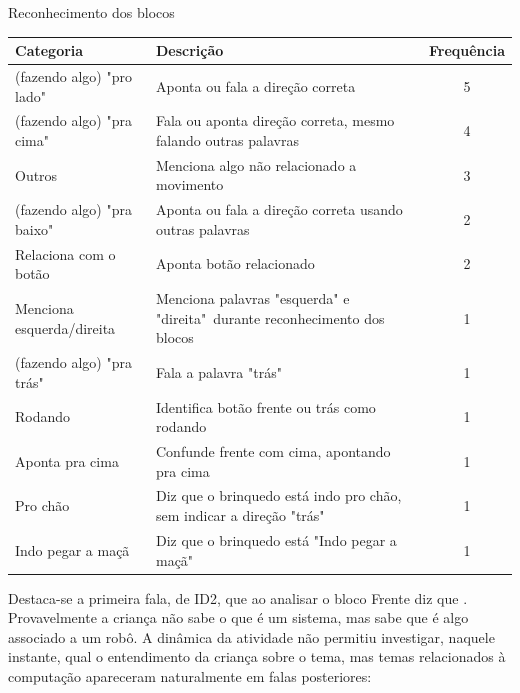 \begin{quadro}[!h]
   \begin{table_env}
   \caption{Reconhecimento dos blocos}
    \label{quadro:reconhecimentoblocos}
    \begin{tabular}{@{}l m{} c@{}}
        \toprule
        Categoria                   & Descrição                                                                  & Frequência \\ \midrule
        (fazendo algo) "pro lado"   & Aponta ou fala a direção correta                                           & 5 \\
        (fazendo algo) "pra cima"   & Fala ou aponta direção correta, mesmo falando outras palavras              & 4 \\
        Outros                      & Menciona algo não relacionado a movimento                                  & 3 \\
        (fazendo algo) "pra baixo"  & Aponta ou fala a direção correta usando outras palavras                    & 2 \\
        Relaciona com o botão       & Aponta botão relacionado                                                   & 2 \\
        Menciona esquerda/direita   & Menciona palavras "esquerda" e "direita"\ durante reconhecimento dos blocos & 1 \\
        (fazendo algo) "pra trás"   & Fala a palavra "trás"                                                      & 1 \\
        Rodando                     & Identifica botão frente ou trás como rodando                               & 1 \\
        Aponta pra cima             & Confunde frente com cima, apontando pra cima                               & 1 \\
        Pro chão                    & Diz que o brinquedo está indo pro chão, sem indicar a direção "trás"       & 1 \\ \nidrule
        Indo pegar a maçã           & Diz que o brinquedo está "Indo pegar a maçã"                               & 1 \\ \bottomrule
        \end{tabular}
   \end{table_env}
   \sourceauthor
\end{quadro}

Destaca-se a primeira fala, de ID2, que ao analisar o bloco Frente diz que . Provavelmente a criança não sabe o que é um sistema, mas sabe que é algo associado a um robô. A dinâmica da atividade não permitiu investigar, naquele instante, qual o entendimento da criança sobre o tema, mas temas relacionados à computação apareceram naturalmente em falas posteriores:

